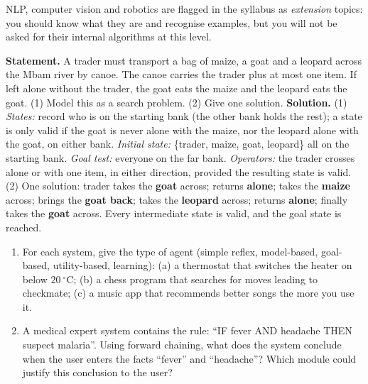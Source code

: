 \documentclass[11pt]{article}
\begin{document}
\begin{savaistu}
NLP, computer vision and robotics are flagged in the syllabus as \emph{extension} topics: you should know what they are and recognise examples, but you will not be asked for their internal algorithms at this level.
\end{savaistu}

\begin{exoresolu}
\textbf{Statement.} A trader must transport a bag of maize, a goat and a leopard across the Mbam river by canoe. The canoe carries the trader plus at most one item. If left alone without the trader, the goat eats the maize and the leopard eats the goat. (1) Model this as a search problem. (2) Give one solution.
\tcblower
\textbf{Solution.} (1) \emph{States:} record who is on the starting bank (the other bank holds the rest); a state is only valid if the goat is never alone with the maize, nor the leopard alone with the goat, on either bank. \emph{Initial state:} \{trader, maize, goat, leopard\} all on the starting bank. \emph{Goal test:} everyone on the far bank. \emph{Operators:} the trader crosses alone or with one item, in either direction, provided the resulting state is valid.
(2) One solution: trader takes the \textbf{goat} across; returns \textbf{alone}; takes the \textbf{maize} across; brings the \textbf{goat back}; takes the \textbf{leopard} across; returns \textbf{alone}; finally takes the \textbf{goat} across. Every intermediate state is valid, and the goal state is reached.
\end{exoresolu}

\begin{exercice}
\begin{enumerate}
\item For each system, give the type of agent (simple reflex, model-based, goal-based, utility-based, learning): (a) a thermostat that switches the heater on below $20\ \mathrm{^{\circ}C}$; (b) a chess program that searches for moves leading to checkmate; (c) a music app that recommends better songs the more you use it.
\item A medical expert system contains the rule: ``IF fever AND headache THEN suspect malaria''. Using forward chaining, what does the system conclude when the user enters the facts ``fever'' and ``headache''? Which module could justify this conclusion to the user?
\end{enumerate}
\end{exercice}
\end{document}
